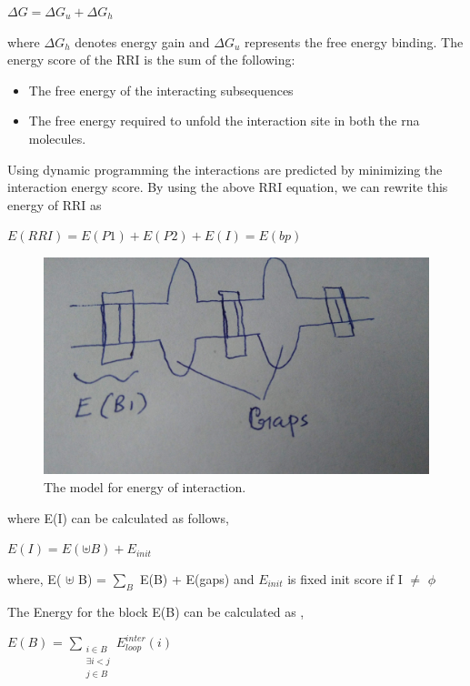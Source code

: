 \documentclass[twoside,a4paper]{report}
\begin{document}
 	\begin{center}
 			$\Delta G = \Delta G_u + \Delta G_h$
 	\end{center}
 
	where $ \Delta G_h$ denotes energy gain and $\Delta G_u$ represents the free energy binding. The energy score of the RRI is the sum of the following:\\
		\begin{itemize}
		\item  The free energy of the interacting subsequences
		\item  The free energy required to unfold the interaction site in both the rna molecules.
		\end{itemize}
	
	Using dynamic programming the interactions are predicted by minimizing the interaction energy score. By using the above RRI equation, we can rewrite this energy of RRI as \\
	
	\begin{center}
		$E(RRI) = E(P1)+E(P2)+E(I) = E(bp)$ 
	\end{center}
	
	\begin{figure}[H]
		\includegraphics[width=0.6\linewidth]{ene}
		\centering
		\caption{The model for energy of interaction. }
		\label{fig:ene}
	\end{figure}

	where E(I) can be calculated as follows,
	
	\begin{center}
		$E(I) = E(  \uplus  B) + E_{init} $
	\end{center}
	\begin{center}
		where, E( $ \uplus $ B) = $\sum_B$ E(B) + E(gaps) and $E_{init}$ is fixed init score if I $\neq$ $\phi$ 
	\end{center}
		
	The Energy for the block E(B) can be calculated as  ,
	
	\begin{center}
	$E(B)$ =  $\sum_{\substack{i \in B \\ \exists i < j \\ j \in B}}E^{inter}_{loop} (i)$
	\end{center}	
	
\end{document}
